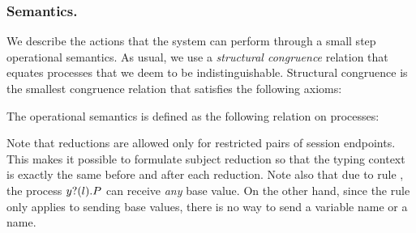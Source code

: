 \documentclass[runningheads]{llncs}
\begin{document}
\subsubsection{Semantics.}
We describe the actions that the system can perform through a small step operational semantics.
As usual, we use  a \emph{structural congruence} relation that equates processes that we deem to be indistinguishable. Structural congruence is the smallest congruence relation that satisfies the following axioms:

The operational semantics is defined as the following relation on processes:

Note that reductions are allowed only for restricted pairs of session endpoints. This makes it possible to formulate subject reduction so that the typing context is exactly the same before and after each reduction.
%
Note also that due to rule , the process \( y ? (l) . P \) can receive \emph{any} base value.
On the other hand, since the rule  only applies to sending base values, there is no way to send a variable name or a name.
\end{document}
